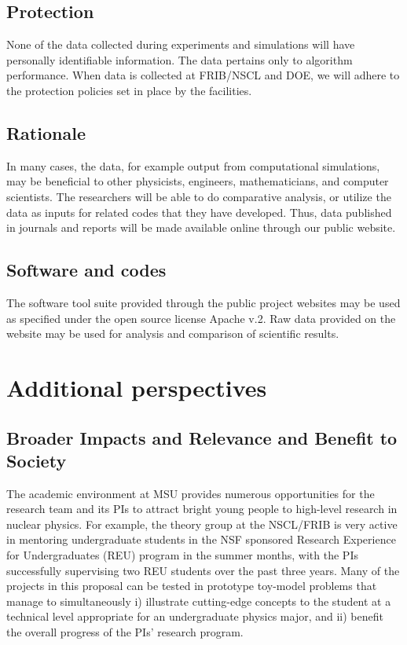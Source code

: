 \documentclass[10pt]{article}
\begin{document}
\subsection{Protection}
None of the data collected during experiments and simulations will have personally identifiable
information. The data pertains only to algorithm performance. When data is collected at FRIB/NSCL
and DOE, we will adhere to the protection policies set in place by the facilities.
\subsection{Rationale}
In many cases, the data, for example output from computational simulations, may be beneficial to
other physicists, engineers, mathematicians, and computer scientists. The researchers will be able
to do comparative analysis, or utilize the data as inputs for related codes that they have developed.
Thus, data published in journals and reports will be made available online through our public
website.
\subsection{Software and codes}
The software tool suite provided through the public project websites may be used as specified
under the open source license Apache v.2. Raw data provided on the website may be used for
analysis and comparison of scientific results.



\section{Additional perspectives}

\subsection{Broader Impacts and Relevance and Benefit to Society}

The academic environment at MSU provides numerous opportunities for
the research team and its PIs to attract bright young people to high-level research in
nuclear physics. For example, the theory group at the NSCL/FRIB is very
active in mentoring undergraduate students in the NSF sponsored
Research Experience for Undergraduates (REU) program in the summer
months, with the PIs successfully supervising two REU students over
the past three years. Many of the projects in this proposal can be
tested in prototype toy-model problems that manage to simultaneously
i) illustrate cutting-edge concepts to the student at a technical
level appropriate for an undergraduate physics major, and ii) benefit
the overall progress of the PIs' research program.
\end{document}
